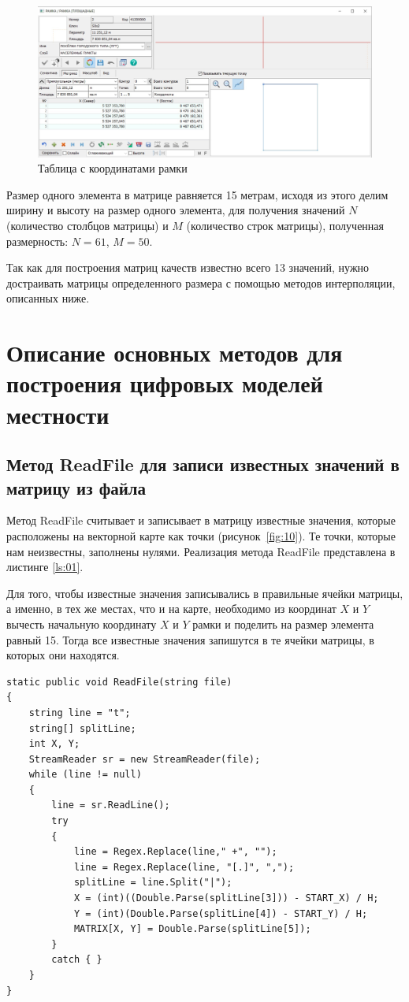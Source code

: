 \begin{figure}[h!]
    \center
    \includegraphics[scale=0.3]{images/222.jpg}
    \caption{Таблица с координатами рамки}
    \label{fig:9}
\end{figure}

Размер одного элемента в матрице равняется 15 метрам, исходя из этого делим ширину и высоту на размер одного элемента, для получения значений $N$ (количество столбцов матрицы) и $M$ (количество строк матрицы), полученная размерность: $N = 61$,  $M = 50$.

Так как для построения матриц качеств известно всего 13 значений, нужно достраивать матрицы определенного размера с помощью методов интерполяции, описанных ниже.

\section{Описание основных методов для построения цифровых моделей местности}

\subsection{Метод ReadFile для записи известных значений в матрицу из файла}

Метод ReadFile считывает и записывает в матрицу известные значения, которые расположены на векторной карте как точки (рисунок~\ref{fig:10}). Те точки, которые нам неизвестны, заполнены нулями. Реализация метода ReadFile представлена в листинге \ref{ls:01}.

Для того, чтобы известные значения записывались в правильные ячейки матрицы, а именно, в тех же местах, что и на карте, необходимо из координат $X$ и $Y$ вычесть начальную координату $X$ и $Y$ рамки и поделить на размер элемента равный 15. Тогда все известные значения запишутся в те ячейки матрицы, в которых они находятся.

\begin{lstlisting}[caption={Метод ReadFile}, label={ls:01}]
static public void ReadFile(string file)
{
    string line = "t";
    string[] splitLine;
    int X, Y;
    StreamReader sr = new StreamReader(file);
    while (line != null)
    {
        line = sr.ReadLine();
        try
        {
            line = Regex.Replace(line," +", "");
            line = Regex.Replace(line, "[.]", ","); 
            splitLine = line.Split("|");
            X = (int)((Double.Parse(splitLine[3])) - START_X) / H;
            Y = (int)(Double.Parse(splitLine[4]) - START_Y) / H;
            MATRIX[X, Y] = Double.Parse(splitLine[5]);  
        }
        catch { }
    }
}
\end{lstlisting}

